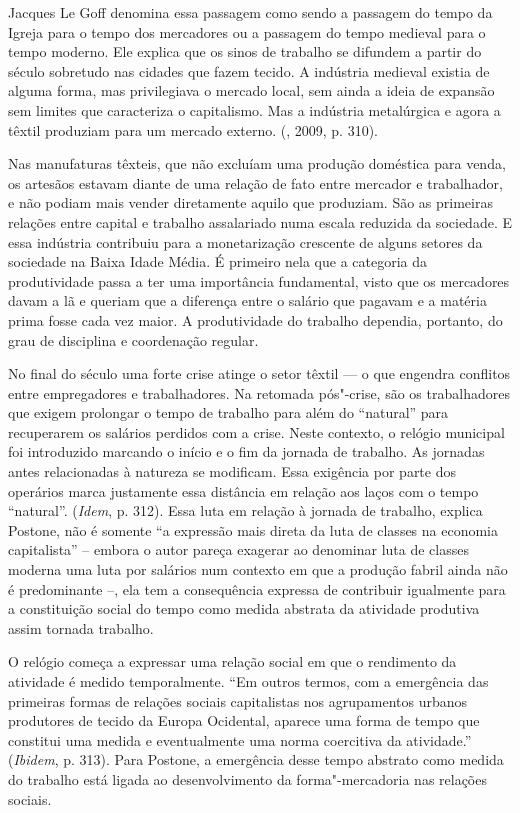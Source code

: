 Jacques Le Goff denomina essa passagem como sendo a passagem do
tempo da Igreja para o tempo dos mercadores ou a passagem do tempo
medieval para o tempo moderno. Ele explica que os sinos de trabalho se
difundem a partir do século  sobretudo nas cidades que fazem tecido.
A indústria medieval existia de alguma forma, mas privilegiava o mercado
local, sem ainda a ideia de expansão sem limites que caracteriza o
capitalismo. Mas a indústria metalúrgica e agora a têxtil produziam para
um mercado externo. (, 2009, p. 310).

Nas manufaturas têxteis, que não excluíam uma produção doméstica para
venda, os artesãos estavam diante de uma relação de fato entre
mercador e trabalhador, e não podiam mais vender diretamente aquilo que
produziam. São as primeiras relações entre capital e trabalho
assalariado numa escala reduzida da sociedade. E essa indústria
contribuiu para a monetarização crescente de alguns setores da sociedade
na Baixa Idade Média. É primeiro nela que a categoria da produtividade
passa a ter uma importância fundamental, visto que os mercadores davam a
lã e queriam que a diferença entre o salário que pagavam e a matéria
prima fosse cada vez maior. A produtividade do trabalho dependia,
portanto, do grau de disciplina e coordenação regular.

No final do século  uma forte crise atinge o setor têxtil --- o que
engendra conflitos entre empregadores e trabalhadores. Na retomada
pós"-crise, são os trabalhadores que exigem prolongar o tempo de trabalho
para além do ``natural'' para recuperarem os salários perdidos com a
crise. Neste contexto, o relógio municipal foi introduzido marcando o
início e o fim da jornada de trabalho. As jornadas antes relacionadas à
natureza se modificam. Essa exigência por parte dos operários marca
justamente essa distância em relação aos laços com o tempo ``natural''.
(\emph{Idem}, p. 312). Essa luta em relação à jornada de trabalho,
explica Postone, não é somente ``a expressão mais direta da luta de
classes na economia capitalista'' -- embora o autor pareça exagerar ao
denominar luta de classes moderna uma luta por salários num contexto em
que a produção fabril ainda não é predominante --, ela tem a
consequência expressa de contribuir igualmente para a constituição
social do tempo como medida abstrata da atividade produtiva assim
tornada trabalho.

O relógio começa a expressar uma relação social em que o
rendimento da atividade é medido temporalmente. ``Em outros termos, com
a emergência das primeiras formas de relações sociais capitalistas nos
agrupamentos urbanos produtores de tecido da Europa Ocidental, aparece
uma forma de tempo que constitui uma medida e eventualmente uma norma
coercitiva da atividade.'' (\emph{Ibidem}, p. 313). Para Postone, a
emergência desse tempo abstrato como medida do trabalho está ligada ao
desenvolvimento da forma"-mercadoria nas relações sociais.

